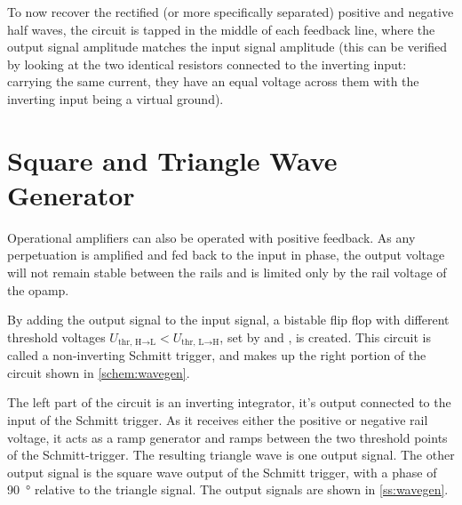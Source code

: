 To now recover the rectified (or more specifically separated) positive and negative half waves, the circuit is tapped in the middle of each feedback line, where the output signal amplitude matches the input signal amplitude (this can be verified by looking at the two identical resistors connected to the inverting input: carrying the same current, they have an equal voltage across them with the inverting input being a virtual ground).

\section{Square and Triangle Wave Generator}

Operational amplifiers can also be operated with positive feedback.
As any perpetuation is amplified and fed back to the input in phase, the output voltage will not remain stable between the rails and is limited only by the rail voltage of the opamp.

By adding the output signal to the input signal, a bistable flip flop with different threshold voltages $U_{\text{thr, H} \rightarrow \text{L}} < U_{\text{thr, L} \rightarrow \text{H}}$, set by  and , is created.
This circuit is called a non-inverting Schmitt trigger, and makes up the right portion of the circuit shown in \autoref{schem:wavegen}.

The left part of the circuit is an inverting integrator, it's output connected to the input of the Schmitt trigger.
As it receives either the positive or negative rail voltage, it acts as a ramp generator and ramps between the two threshold points of the Schmitt-trigger.
The resulting triangle wave is one output signal.
The other output signal is the square wave output of the Schmitt trigger, with a phase of \SI{90}{\degree} relative to the triangle signal.
The output signals are shown in \autoref{ss:wavegen}.

